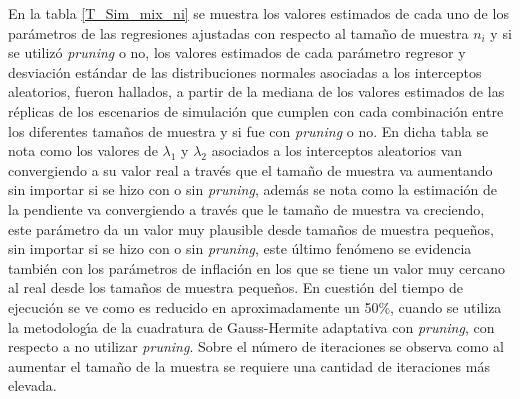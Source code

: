 En la tabla \ref{T_Sim_mix_ni} se muestra los valores estimados de cada uno de los par\'{a}metros de las regresiones ajustadas con respecto al tama\~{n}o de muestra $n_i$ y si se utiliz\'{o} \textit{pruning} o no, los valores estimados de cada par\'{a}metro regresor y desviaci\'{o}n est\'{a}ndar de las distribuciones normales asociadas a los interceptos aleatorios, fueron hallados, a partir de la mediana de los valores estimados de las r\'{e}plicas de los escenarios de simulaci\'{o}n que cumplen con cada combinaci\'{o}n entre los diferentes tama\~{n}os de muestra y si fue con \textit{pruning} o no. En dicha tabla se nota como los valores de $\lambda_1$ y $\lambda_2$ asociados a los interceptos aleatorios van convergiendo a su valor real a trav\'{e}s que el tama\~{n}o de muestra va aumentando sin importar si se hizo con o sin \textit{pruning}, adem\'{a}s se nota como la estimaci\'{o}n de la pendiente va convergiendo a trav\'{e}s que le tama\~{n}o de muestra va creciendo, este par\'{a}metro da un valor muy plausible desde tama\~{n}os de muestra peque\~{n}os, sin importar si se hizo con o sin \textit{pruning}, este \'{u}ltimo fen\'{o}meno se evidencia tambi\'{e}n con los par\'{a}metros de inflaci\'{o}n en los que se tiene un valor muy cercano al real desde los tama\~{n}os de muestra peque\~{n}os. En cuesti\'{o}n del tiempo de ejecuci\'{o}n se ve como es reducido en aproximadamente un 50\%, cuando se utiliza la metodolog\'{\i}a de la cuadratura de Gauss-Hermite adaptativa con \textit{pruning}, con respecto a no utilizar \textit{pruning}. Sobre el n\'{u}mero de iteraciones se observa como al aumentar el tama\~{n}o de la muestra se requiere una cantidad de iteraciones m\'{a}s elevada.\\

